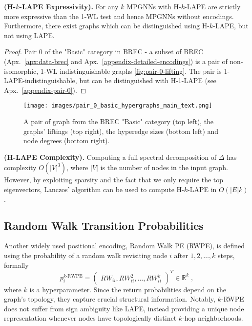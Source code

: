 \begin{theorem}\label{thm:lape_exp} \textbf{(H-$k$-LAPE Expressivity).} For any $k$ MPGNNs with H-$k$-LAPE are strictly more expressive than the 1-WL test and hence MPGNNs without encodings. Furthermore, there exist graphs which can be distinguished using H-$k$-LAPE, but not using LAPE. 
\end{theorem}



\begin{proof}
    Pair $0$ of the "Basic" category in BREC - a subset of BREC (Apx.~\ref{apx:data-brec} and Apx.~\ref{appendix-detailed-encodings}) is a pair of non-isomorphic, 1-WL indistinguishable graphs \ref{fig:pair-0-lifting}. The pair is 1-LAPE-indistinguishable, but can be distinguished with H-1-LAPE (see Apx.~\ref{appendix-pair-0}).
\end{proof}

\begin{figure*}[h!]
  \centering  \texttt{[image: images/pair\_0\_basic\_hypergraphs\_main\_text.png]}
  \caption{A pair of graph from the BREC "Basic" category  (top left), the graphs' liftings (top right), the hyperedge sizes (bottom left) and node degrees (bottom right).}
  \label{fig:pair-0-main}
\end{figure*}

\begin{rmk}\label{thm:lape_comp} \textbf{(H-LAPE Complexity).} Computing a full spectral decomposition of $\Delta$ has complexity $O(|V|^3)$, where $|V|$ is the number of nodes in the input graph. However, by exploiting sparsity and the fact that we only require the top eigenvectors, Lanczos' algorithm can be used to compute H-$k$-LAPE in $O(\vert E \vert k)$.
\end{rmk}


\subsection{Random Walk Transition Probabilities}
Another widely used positional encoding, Random Walk PE (RWPE), is defined using the probability of a random walk revisiting node $i$ after $1, 2, \hdots, k$ steps, formally
\begin{equation}
\label{RWPE}
p_i^{k\text{-RWPE}} = \begin{pmatrix} RW_{ii}, RW_{ii}^2, \hdots, RW_{ii}^k
\end{pmatrix}^T 
\in \mathbb{R}^k \; ,
\end{equation}
where $k$ is a hyperparameter. Since the return probabilities depend on the graph's topology, they capture crucial structural information. Notably, $k$-RWPE
does not suffer from sign ambiguity like LAPE, instead providing a unique node representation whenever nodes have topologically distinct $k$-hop neighborhoods. 

